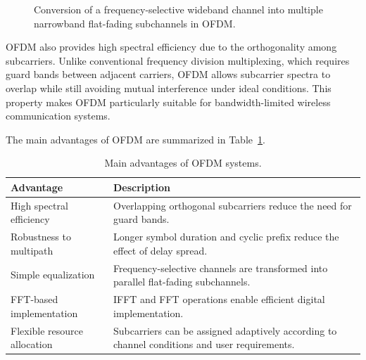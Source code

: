 \begin{figure}[H]
{
    }

    \caption{Conversion of a frequency-selective wideband channel into multiple narrowband flat-fading subchannels in OFDM.}
    \label{fig:ofdm_parallel_subchannels}
\end{figure}


OFDM also provides high spectral efficiency due to the orthogonality among subcarriers. Unlike conventional frequency division multiplexing, which requires guard bands between adjacent carriers, OFDM allows subcarrier spectra to overlap while still avoiding mutual interference under ideal conditions. This property makes OFDM particularly suitable for bandwidth-limited wireless communication systems.

The main advantages of OFDM are summarized in Table~\ref{tab:ofdm_advantages}.

\begin{table}[H]
\centering
\caption{Main advantages of OFDM systems.}
\label{tab:ofdm_advantages}

\begin{tabular}{|p{4cm}|p{8cm}|}
\hline
\textbf{Advantage} &
\textbf{Description} \\
\hline

High spectral efficiency &
Overlapping orthogonal subcarriers reduce the need for guard bands. \\
\hline

Robustness to multipath &
Longer symbol duration and cyclic prefix reduce the effect of delay spread. \\
\hline

Simple equalization &
Frequency-selective channels are transformed into parallel flat-fading subchannels. \\
\hline

FFT-based implementation &
IFFT and FFT operations enable efficient digital implementation. \\
\hline

Flexible resource allocation &
Subcarriers can be assigned adaptively according to channel conditions and user requirements. \\
\hline

\end{tabular}

\end{table}


